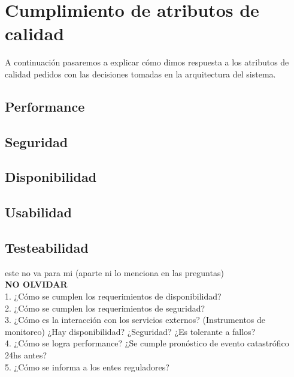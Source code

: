 \section{Cumplimiento de atributos de calidad}

\par A continuación pasaremos a explicar cómo dimos respuesta a los atributos de calidad pedidos con las decisiones tomadas en la arquitectura del sistema.

\subsection{Performance}

\par 

\subsection{Seguridad}

\par

\subsection{Disponibilidad}

\par

\subsection{Usabilidad}

\par

\subsection{Testeabilidad}

este no va para mi (aparte ni lo menciona en las preguntas)\\



\textbf{NO OLVIDAR}\\
1. ¿Cómo se cumplen los requerimientos de disponibilidad?\\
2. ¿Cómo se cumplen los requerimientos de seguridad?\\
3. ¿Cómo es la interacción con los servicios externos? (Instrumentos de monitoreo) ¿Hay
disponibilidad? ¿Seguridad? ¿Es tolerante a fallos?\\
4. ¿Cómo se logra performance? ¿Se cumple pronóstico de evento catastrófico 24hs
antes?\\
5. ¿Cómo se informa a los entes reguladores?